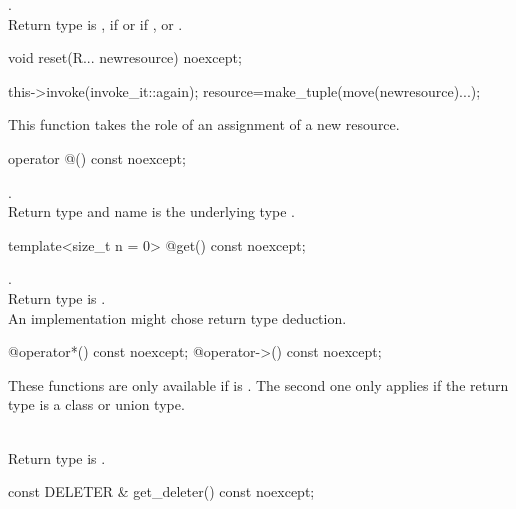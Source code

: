 \documentclass[ebook,11pt,article]{memoir}
\begin{document}
\pnum
\effects {}

\pnum
\returns {}. 
\\Return type is , if  or  if , or .

\begin{itemdecl}
	void reset(R... newresource) noexcept;
\end{itemdecl}

\pnum
\effects 
\begin{codeblock}
this->invoke(invoke_it::again); 
resource=make_tuple(move(newresource)...);
\end{codeblock}

\pnum
\enternote This function takes the role of an assignment of a new resource.
\exitnote

\begin{itemdecl}
	operator  @\seebelow@() const noexcept;
\end{itemdecl}

\pnum
\returns {}.
\\Return type and  name is the underlying type . 

\begin{itemdecl}
	template<size_t n = 0>
	@\seebelow@  get() const noexcept;
\end{itemdecl}

\pnum
\returns {}.
\\Return type is . 
\\\enternote An implementation might chose  return type deduction.
\exitnote

\begin{itemdecl}
	@\seebelow@  operator*() const noexcept;
	@\seebelow@  operator->() const noexcept;
\end{itemdecl}

\pnum
\requires These functions are only available if  is . The second one only applies if the return type is a class or union type.

\pnum
\returns {}
\\Return type is . 

\begin{itemdecl}
	const DELETER & get_deleter() const noexcept;
\end{itemdecl}
\end{document}
